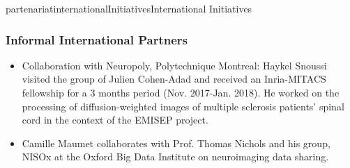 \documentclass{ra2018}
\begin{document}
\begin{module}{partenariat}{internationalInitiatives}{International Initiatives}
        \subsubsection{Informal International Partners}
        

\begin{itemize}
    \item Collaboration with Neuropoly, Polytechnique Montreal: Haykel Snoussi visited the group of Julien Cohen-Adad and received an Inria-MITACS fellowship for a 3 months period (Nov. 2017-Jan. 2018). He worked on the processing of diffusion-weighted images of multiple sclerosis patients' spinal cord in the context of the EMISEP project.
    \item Camille Maumet collaborates with Prof. Thomas Nichols and his group, NISOx at the Oxford Big Data Institute on neuroimaging data sharing.
\end{itemize}






\end{module}
\end{document}
